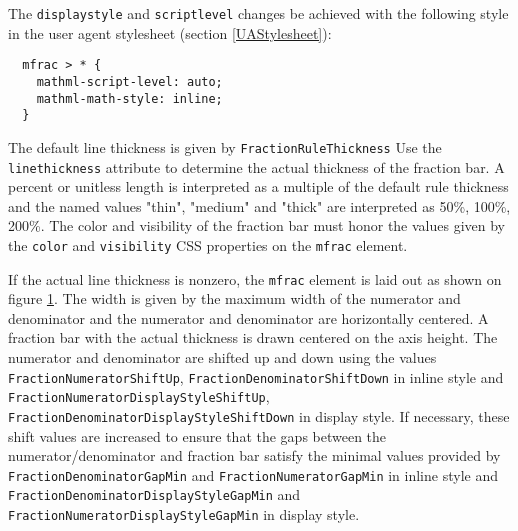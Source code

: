 The {\tt displaystyle} and {\tt scriptlevel} changes be achieved with the
following style in the user agent stylesheet (section \ref{UAStylesheet}):
%
\begin{lstlisting}
  mfrac > * {
    mathml-script-level: auto;
    mathml-math-style: inline;
  }
\end{lstlisting}
%
The default line thickness is given by {\tt FractionRuleThickness}
Use the {\tt linethickness} attribute \cite{MathML3} to determine the
actual thickness of the fraction bar. A percent or unitless length is
interpreted as a multiple of the default rule thickness and
the named values "thin", "medium" and "thick" are interpreted as
50\%, 100\%, 200\%.
The color and visibility of the fraction bar must honor the values given by the
{\tt color} and {\tt visibility} CSS properties on the {\tt mfrac} element.

If the actual line thickness is nonzero, the {\tt mfrac} element is laid out as
shown on figure \ref{FractionBoxModel}.
The width is given by the maximum width of the
numerator and denominator and the numerator and denominator are horizontally
centered. A fraction bar with the actual thickness is drawn centered on the
axis height. The numerator and denominator are shifted
up and down using the values {\tt FractionNumeratorShiftUp},
{\tt FractionDenominatorShiftDown} in inline style and
{\tt FractionNumeratorDisplayStyleShiftUp},
{\tt FractionDenominatorDisplayStyleShiftDown} in display style.
If necessary, these shift values are increased to ensure that the gaps between
the numerator/denominator and fraction bar satisfy the minimal values provided
by {\tt FractionDenominatorGapMin} and
{\tt FractionNumeratorGapMin} in inline style and
{\tt FractionDenominatorDisplayStyleGapMin} and
{\tt FractionNumeratorDisplayStyleGapMin} in display style.

\begin{figure}
\centering
{}
\label{FractionBoxModel}
\end{figure}

